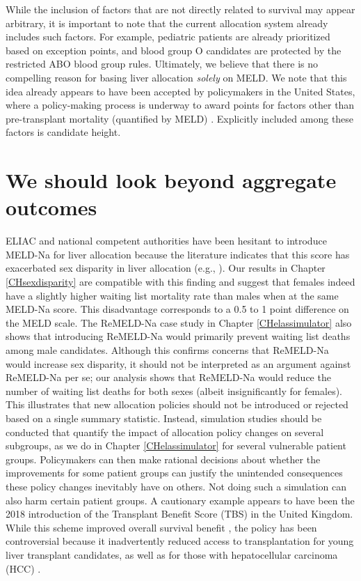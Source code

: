 \documentclass[11pt,twoside,]{book}
\begin{document}
While the inclusion of factors that are not directly related to survival may appear
arbitrary, it is important to note that the current allocation system already
includes such factors. For example, pediatric patients are already prioritized based on
exception points, and blood group O candidates are protected by the
restricted ABO blood group rules. Ultimately, we believe that there is no
compelling reason for basing liver allocation \emph{solely} on MELD. We note that this
idea already appears to have been accepted by policymakers in the United States,
where a policy-making process is underway to award points for factors other than
pre-transplant mortality (quantified by MELD) \citep{kimMELD3point0}. Explicitly included among these factors
is candidate height.

\section{We should look beyond aggregate outcomes}\label{we-should-look-beyond-aggregate-outcomes}

ELIAC and national competent authorities have been hesitant to introduce
MELD-Na for liver allocation because the literature indicates that this score has exacerbated sex disparity in liver allocation (e.g., \citep{allenReducedAccessLiver2018}).
Our results in Chapter \ref{CHsexdisparity} are compatible with this finding
and suggest that females indeed have a slightly higher waiting list mortality rate
than males when at the same MELD-Na score. This disadvantage corresponds to a 0.5
to 1 point difference on the MELD scale. The ReMELD-Na case study in Chapter \ref{CHelassimulator} also
shows that introducing ReMELD-Na would primarily prevent waiting list deaths
among male candidates. Although this confirms concerns that ReMELD-Na would increase sex
disparity, it should not be interpreted as an argument against ReMELD-Na per se;
our analysis shows that ReMELD-Na would reduce the number of
waiting list deaths for both sexes (albeit insignificantly for females).
\newpage
This illustrates that new allocation policies should not be introduced or rejected
based on a single summary statistic. Instead, simulation studies should be
conducted that quantify the impact of allocation policy changes on several
subgroups, as we do in Chapter \ref{CHelassimulator} for several vulnerable
patient groups. Policymakers can then make
rational decisions about whether the improvements for some patient groups can justify
the unintended consequences these policy changes inevitably have on others. Not doing such a simulation
can also harm certain patient groups. A cautionary example appears to have been
the 2018 introduction of the Transplant Benefit Score (TBS) in the United Kingdom. While this scheme improved overall survival benefit \citep{Allen2024}, the policy has been controversial because it inadvertently reduced access to
transplantation for young liver transplant candidates, as well as for those
with hepatocellular carcinoma (HCC) \citep{Attia2023, Attia2024}.
\end{document}
